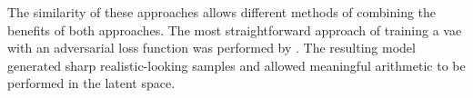The similarity of these approaches allows different methods of combining the benefits of both approaches. The most straightforward approach of training a \acrshort{vae} with an adversarial loss function was performed by \textcite{LarsenSW15autoencodingbeyond}. The resulting model generated sharp realistic-looking samples and allowed meaningful arithmetic to be performed in the latent space.

% 
% 
% 

